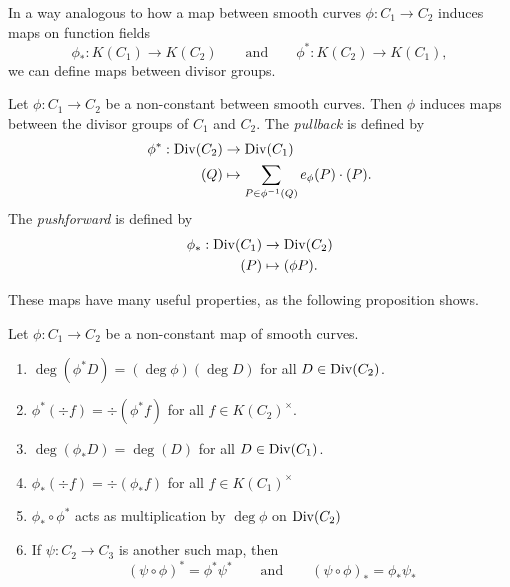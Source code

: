 
In a way analogous to how a map between smooth curves $\phi: C_1 \to C_2$
induces maps on function fields
\begin{equation*}
	\phi_*: K(C_1) \to K(C_2)
	\qquad\textrm{and}\qquad
	\phi^*: K(C_2) \to K(C_1),
\end{equation*}
we can define maps between divisor groups.

\begin{definition}
	Let $\phi: C_1 \to C_2$ be a non-constant between smooth curves.
	Then $\phi$ induces maps between the divisor groups of $C_1$ and $C_2$.
	The \emph{pullback} is defined by
	\begin{align*}
		\phi^*: \operatorname{Div}(C_2) &\to \operatorname{Div}(C_1)\\
		(Q) &\mapsto \sum_{P \in \phi^{-1}(Q)}e_\phi(P)\cdot(P).
	\end{align*}
	The \emph{pushforward} is defined by
	\begin{align*}
		\phi_*: \operatorname{Div}(C_1) &\to \operatorname{Div}(C_2)\\
		(P) &\mapsto (\phi P).
	\end{align*}
\end{definition}

These maps have many useful properties, as the following proposition shows.

\begin{proposition}
	\label{prop:divisor-map-properties}
	Let $\phi: C_1 \to C_2$ be a non-constant map of smooth curves.
	\begin{enumerate}[label=(\alph*), itemsep=0em]
		\item $\deg(\phi^*D) = (\deg\phi)(\deg D)$ for all $D \in \operatorname{Div}(C_2)$.
		\item $\phi^*(\div f) = \div(\phi^* f)$ for all $f \in K(C_2)^\times$.
		\item $\deg(\phi_*D) = \deg(D)$ for all $D \in \operatorname{Div}(C_1)$.
		\item $\phi_*(\div f) = \div(\phi_* f)$ for all $f\in K(C_1)^\times$
		\item $\phi_*\circ \phi^*$ acts as multiplication by $\deg \phi$
			on $\operatorname{Div}(C_2)$
		\item If $\psi: C_2\to C_3$ is another such map,
			then
			\begin{equation*}
				(\psi\circ\phi)^* = \phi^*\psi^*
				\qquad\textrm{and}\qquad
				(\psi\circ\phi)_* = \phi_*\psi_*
			\end{equation*}
	\end{enumerate}
\end{proposition}

